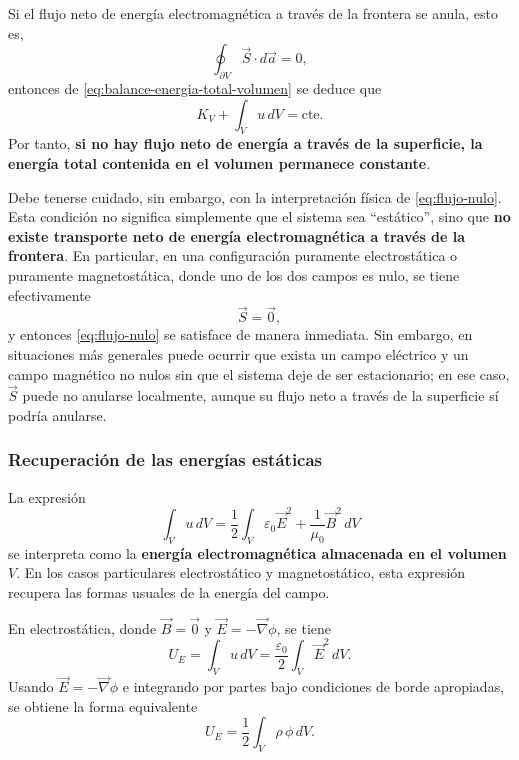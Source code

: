 \documentclass[12pt,a4paper]{article}
\theoremstyle{definition}
\theoremstyle{plain}
\numberwithin{equation}{section}
\theoremstyle{remark}
\newcommand{\E}{\vec{E}}
\newcommand{\B}{\vec{B}}
\begin{document}
Si el flujo neto de energía electromagnética a través de la frontera se anula, esto es,
\begin{equation}
    \oint_{\partial V}\vec S\cdot d\vec a=0,
    \label{eq:flujo-nulo}
\end{equation}
entonces de \eqref{eq:balance-energia-total-volumen} se deduce que
\begin{equation*}
    K_V+\int_V u\,dV=\mathrm{cte}.
\end{equation*}
Por tanto, \textbf{si no hay flujo neto de energía a través de la superficie, la energía total contenida en el volumen permanece constante}.

Debe tenerse cuidado, sin embargo, con la interpretación física de \eqref{eq:flujo-nulo}. Esta condición no significa simplemente que el sistema sea “estático”, sino que \textbf{no existe transporte neto de energía electromagnética a través de la frontera}. En particular, en una configuración puramente electrostática o puramente magnetostática, donde uno de los dos campos es nulo, se tiene efectivamente
\begin{equation*}
    \vec S=\vec 0,
\end{equation*}
y entonces \eqref{eq:flujo-nulo} se satisface de manera inmediata. Sin embargo, en situaciones más generales puede ocurrir que exista un campo eléctrico y un campo magnético no nulos sin que el sistema deje de ser estacionario; en ese caso, \(\vec S\) puede no anularse localmente, aunque su flujo neto a través de la superficie sí podría anularse.

\subsubsection*{Recuperación de las energías estáticas}

La expresión
\begin{equation*}
    \int_V u\,dV =\frac{1}{2} \int_V \varepsilon_0\E^2+\frac{1}{\mu_0}\B^2\,dV
\end{equation*}
se interpreta como la \textbf{energía electromagnética almacenada en el volumen} $V$. En los casos particulares electrostático y magnetostático, esta expresión recupera las formas usuales de la energía del campo.

En electrostática, donde $\B=\vec 0$ y $\E=-\vec\nabla\phi$, se tiene
\begin{equation*}
    U_E=\int_V u\,dV=\frac{\varepsilon_0}{2}\int_V \E^2\,dV.
\end{equation*}
Usando $\E=-\vec\nabla\phi$ e integrando por partes bajo condiciones de borde apropiadas, se obtiene la forma equivalente
\begin{equation*}
    U_E=\frac{1}{2}\int_V \rho\,\phi\,dV.
\end{equation*}
\end{document}
